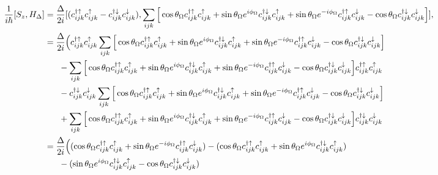 \documentclass[10pt,prb,showpacs,amssymb,floatfix]{revtex4-1}
\newcommand{\dg}{\dagger}
\newcommand{\dna}{\downarrow}
\newcommand{\nn}{\nonumber}
\newcommand{\upa}{\uparrow}
\newcommand{\Dlt}{\Delta}
\newcommand{\Og}{\Omega}
\begin{document}
\begin{align}
\frac{1}{i\hbar}[S_z, H_\Dlt] &=  \frac{\Dlt}{2i} [(c_{ijk}^{\dg\upa} c_{ijk}^{\upa} - c_{ijk}^{\dg\dna} c_{ijk}^{\dna}), \sum_{ijk} \Big{[} \cos\theta_\Og c_{ijk}^{\dagger \uparrow} c_{ijk}^\uparrow +  \sin\theta_\Og e^{i\phi_\Og} c_{ijk}^{\dagger \downarrow} c_{ijk}^\uparrow+  \sin\theta_\Og e^{-i\phi_\Og} c_{ijk}^{\dagger \uparrow} c_{ijk}^\downarrow - \cos\theta_\Og  c_{ijk}^{\dagger \downarrow} c_{ijk}^\downarrow  \Big{]}], \nn\\
&=  \frac{\Dlt}{2i} \Big{(} c_{ijk}^{\dg\upa} c_{ijk}^{\upa} \sum_{ijk} \Big{[} \cos\theta_\Og c_{ijk}^{\dagger \uparrow} c_{ijk}^\uparrow +  \sin\theta_\Og e^{i\phi_\Og} c_{ijk}^{\dagger \downarrow} c_{ijk}^\uparrow+  \sin\theta_\Og e^{-i\phi_\Og} c_{ijk}^{\dagger \uparrow} c_{ijk}^\downarrow - \cos\theta_\Og  c_{ijk}^{\dagger \downarrow} c_{ijk}^\downarrow  \Big{]}   \nn\\ 
& ~~~~~  -   \sum_{ijk} \Big{[} \cos\theta_\Og c_{ijk}^{\dagger \uparrow} c_{ijk}^\uparrow +  \sin\theta_\Og e^{i\phi_\Og} c_{ijk}^{\dagger \downarrow} c_{ijk}^\uparrow+  \sin\theta_\Og e^{-i\phi_\Og} c_{ijk}^{\dagger \uparrow} c_{ijk}^\downarrow - \cos\theta_\Og  c_{ijk}^{\dagger \downarrow} c_{ijk}^\downarrow  \Big{]} c_{ijk}^{\dg\upa} c_{ijk}^{\upa} \nn\\
& ~~~~~ - c_{ijk}^{\dg\dna} c_{ijk}^{\dna} \sum_{ijk} \Big{[} \cos\theta_\Og c_{ijk}^{\dagger \uparrow} c_{ijk}^\uparrow +  \sin\theta_\Og e^{i\phi_\Og} c_{ijk}^{\dagger \downarrow} c_{ijk}^\uparrow+  \sin\theta_\Og e^{-i\phi_\Og} c_{ijk}^{\dagger \uparrow} c_{ijk}^\downarrow - \cos\theta_\Og  c_{ijk}^{\dagger \downarrow} c_{ijk}^\downarrow  \Big{]} \nn\\
& ~~~~~ + \sum_{ijk} \Big{[} \cos\theta_\Og c_{ijk}^{\dagger \uparrow} c_{ijk}^\uparrow +  \sin\theta_\Og e^{i\phi_\Og} c_{ijk}^{\dagger \downarrow} c_{ijk}^\uparrow+  \sin\theta_\Og e^{-i\phi_\Og} c_{ijk}^{\dagger \uparrow} c_{ijk}^\downarrow - \cos\theta_\Og  c_{ijk}^{\dagger \downarrow} c_{ijk}^\downarrow  \Big{]} c_{ijk}^{\dg\dna} c_{ijk}^{\dna} \nn\\
&=  \frac{\Dlt}{2i} \Big{(} ( \cos\theta_\Og  c_{ijk}^{\dg\upa} c_{ijk}^{\upa}  +  \sin\theta_\Og e^{-i\phi_\Og} c_{ijk}^{\dagger \upa} c_{ijk}^\dna)
 - ( \cos\theta_\Og c_{ijk}^{\dagger \upa} c_{ijk}^\uparrow +  \sin\theta_\Og e^{i\phi_\Og} c_{ijk}^{\dagger \dna} c_{ijk}^\upa)  \nn\\
&~~~~~ -  ( \sin\theta_\Og e^{i\phi_\Og} c_{ijk}^{\dagger \dna} c_{ijk}^\uparrow - \cos\theta_\Og  c_{ijk}^{\dagger \downarrow} c_{ijk}^\dna ) 

\end{align}
\end{document}
